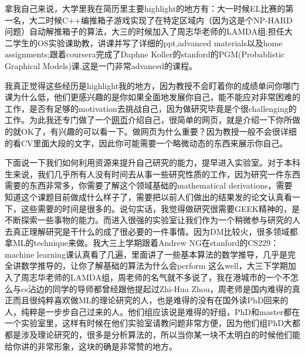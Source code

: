 拿我自己来说，大学里我在简历里主要highlight的地方有：大一时候EL比赛的第一名，大二时候C++编推箱子游戏实现了在特定区域内（因为这是个NP-HARD问题）自动解推箱子的算法，大三的时候加入了周志华老师的LAMDA组;担任大二学生的OS实验课助教，讲课并写了详细的ppt,advanced materials以及home assignments;跟着coursera完成了Daphne Koller的stanford的PGM(Probablistic Graphical Models)课,这是一门非常advanced的课程。\par

我真正觉得这些经历是highlight我的地方，因为教授不会盯着你的成绩单问你哪门课为什么低，他们更感兴趣的是你如果全面地发展你自己，能不能应对非常困难的工作，是否有足够的motivation去挑战自己，因为做研究毕竟是个很challenging的工作。为此我还专门做了一个\href{http://www.zhengyudian.com}{网页}介绍自己，很简单的网页，就是介绍一下你所做的就OK了，有兴趣的可以看一下。做网页为什么重要？因为教授一般不会很详细的看CV里面大段的文字，因此你可能需要一个略微动态的东西来展示你自己。\par

下面说一下我们如何利用资源来提升自己研究的能力，提早进入实验室。对于本科生来说，我们几乎所有人没有时间去从事一些研究性质的工作，因为研究一件东西需要的东西非常多，你需要了解这个领域基础的mathematical derivations，需要知道这个课题目前做成什么样子了，需要把以前人们做出的结果发的论文认真看一下，这些需要的时间是很多的。说句实话，我觉得做研究很需要GEEK精神的，是不断探索一些事物的能力。而进入很强的实验室让我们作为一个稍微参与研究的人去真正理解研究是干什么的成了很必要的一件事情。因为DM比较火，很多领域都拿ML的technique来做。我大三上学期跟着Andrew NG在stanford的CS229：machine learning课认真看了几遍，里面讲了一些基本算法的数学推导，几乎是完全讲数学推导的，让你了解基础的算法为什么会perform 这么well，大三下学期加入了周志华老师的LAMDA组，周老师的名气就不多说了，我在港城市的一个不怎么与cs沾边的同学的导师都曾经跟他提起过Zhi-Hua Zhou，周老师是国内难得的真正而且很纯粹喜欢做ML的理论研究的人，也是难得的没有在国外读PhD回来的人，纯粹是一步步自己过来的人。他们组应该说是难得的好组，PhD和master都在一个实验室里，这样有时候在他们实验室请教问题非常方便，因为他们组PhD大都都是涉及理论研究的，很多是分析算法的，所以当你某一块不太明白的时候他们能给你讲的非常形象，这块的确是非常赞的地方。\par
      

